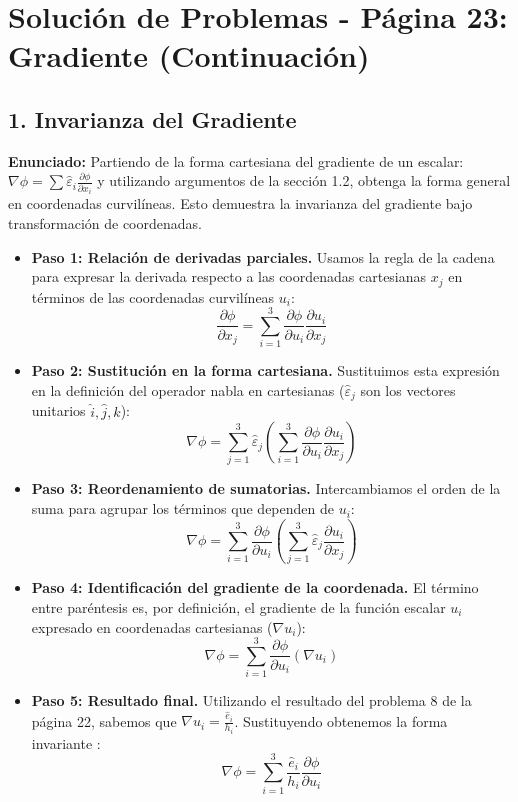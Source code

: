 \documentclass[a4paper]{article}
\begin{document}
\section*{Solución de Problemas - Página 23: Gradiente (Continuación)}

\subsection*{1. Invarianza del Gradiente}
\textbf{Enunciado:} Partiendo de la forma cartesiana del gradiente de un escalar: $\nabla\phi = \sum \hat{\varepsilon}_i \frac{\partial \phi}{\partial x_i}$ y utilizando argumentos de la sección 1.2, obtenga la forma general en coordenadas curvilíneas. Esto demuestra la invarianza del gradiente bajo transformación de coordenadas.

\begin{itemize}
    \item \textbf{Paso 1: Relación de derivadas parciales.} Usamos la regla de la cadena para expresar la derivada respecto a las coordenadas cartesianas $x_j$ en términos de las coordenadas curvilíneas $u_i$:
    \begin{equation}
        \frac{\partial \phi}{\partial x_j} = \sum_{i=1}^3 \frac{\partial \phi}{\partial u_i} \frac{\partial u_i}{\partial x_j}
    \end{equation}
    \item \textbf{Paso 2: Sustitución en la forma cartesiana.} Sustituimos esta expresión en la definición del operador nabla en cartesianas ($\hat{\varepsilon}_j$ son los vectores unitarios $\hat{i}, \hat{j}, \hat{k}$):
    \begin{equation}
        \nabla\phi = \sum_{j=1}^3 \hat{\varepsilon}_j \left( \sum_{i=1}^3 \frac{\partial \phi}{\partial u_i} \frac{\partial u_i}{\partial x_j} \right)
    \end{equation}
    \item \textbf{Paso 3: Reordenamiento de sumatorias.} Intercambiamos el orden de la suma para agrupar los términos que dependen de $u_i$:
    \begin{equation}
        \nabla\phi = \sum_{i=1}^3 \frac{\partial \phi}{\partial u_i} \left( \sum_{j=1}^3 \hat{\varepsilon}_j \frac{\partial u_i}{\partial x_j} \right)
    \end{equation}
    \item \textbf{Paso 4: Identificación del gradiente de la coordenada.} El término entre paréntesis es, por definición, el gradiente de la función escalar $u_i$ expresado en coordenadas cartesianas ($\nabla u_i$):
    \begin{equation}
        \nabla\phi = \sum_{i=1}^3 \frac{\partial \phi}{\partial u_i} (\nabla u_i)
    \end{equation}
    \item \textbf{Paso 5: Resultado final.} Utilizando el resultado del problema 8 de la página 22, sabemos que $\nabla u_i = \frac{\hat{e}_i}{h_i}$. Sustituyendo obtenemos la forma invariante \cite{79, 84}:
    \begin{equation}
        \nabla\phi = \sum_{i=1}^3 \frac{\hat{e}_i}{h_i} \frac{\partial \phi}{\partial u_i}
    \end{equation}
\end{itemize}
\end{document}
